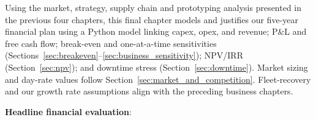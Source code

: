 \documentclass[11pt, a4paper]{report}
\numberwithin{equation}{section}
\begin{document}
\newenvironment{tightitemize}%
  {\begin{itemize}\setlength{\itemsep}{2pt}\setlength{\parskip}{0pt}\setlength{\topsep}{4pt}}%
  {\end{itemize}}
\newenvironment{tightenumerate}%
  {\begin{enumerate}\setlength{\itemsep}{2pt}\setlength{\parskip}{0pt}\setlength{\topsep}{4pt}}%
  {\end{enumerate}}

\begin{refsection}
\graphicspath{{../HarryEmes/Business/figures/}{../HarryEmes/Business/}}

\noindent Using the market, strategy, supply chain and prototyping analysis presented in the previous four chapters, this final chapter models and justifies our five-year financial plan using a
Python model linking
capex, opex, and revenue; P\&L and free cash flow; break-even and one-at-a-time
sensitivities (Sections~\ref{sec:breakeven}--\ref{sec:business_sensitivity});
NPV/IRR (Section~\ref{sec:npv}); and downtime stress
(Section~\ref{sec:downtime}). Market sizing and day-rate values follow
Section~\ref{sec:market_and_competition}. Fleet-recovery and our growth rate assumptions align with the
preceding business chapters.

\medskip

\noindent \textbf{Headline financial evaluation}:


\end{refsection}
\end{document}
